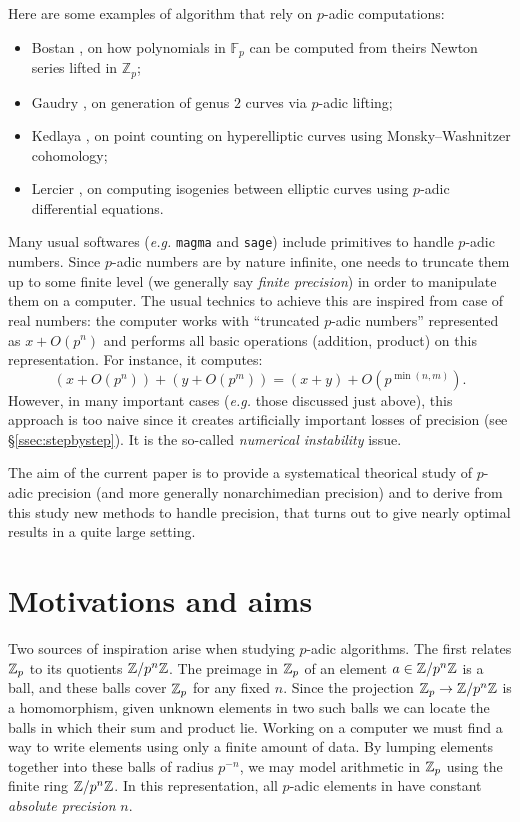 \documentclass{lms}
\begin{document}
Here are some examples of algorithm that rely on $p$-adic computations:
\begin{itemize}
\item Bostan \cite{Bostan}, on how polynomials in $\mathbb{F}_p$ can be computed from theirs Newton series lifted in $\mathbb{Z}_p$;
\item Gaudry \cite{Gaudry}, on generation of genus $2$ curves via $p$-adic lifting;
\item Kedlaya \cite{Kedlaya}, on point counting on hyperelliptic curves using Monsky--Washnitzer cohomology;
\item Lercier \cite{Lercier}, on computing isogenies between elliptic curves using $p$-adic differential equations.
\end{itemize}

Many usual softwares (\emph{e.g.} {\tt magma} and {\tt sage}) include 
primitives to handle $p$-adic numbers. Since $p$-adic numbers are by 
nature infinite, one needs to truncate them up to some finite level (we 
generally say \emph{finite precision}) in order to manipulate them on a 
computer. The usual technics to achieve this are inspired from case of 
real numbers: the computer works with ``truncated $p$-adic numbers'' 
represented as $x + O(p^n)$ and performs all basic operations (addition, 
product) on this representation. For instance, it computes: 
$$(x + O(p^n)) + (y + O(p^m)) = (x+y) + O(p^{\min(n,m)}).$$
However, in many important cases (\emph{e.g.} those discussed just 
above), this approach is too naive since it creates artificially 
important losses of precision (see \S\ref{ssec:stepbystep}). 
It is the so-called \emph{numerical instability} issue.

The aim of the current paper is to provide a systematical theorical 
study of $p$-adic precision (and more generally nonarchimedian 
precision) and to derive from this study new methods to handle 
precision, that turns out to give nearly optimal results in a quite 
large setting.

\section{Motivations and aims}

Two sources of inspiration arise when studying $p$-adic algorithms.
The first relates $\mathbb Z_p$ to its quotients $\mathbb Z/p^n\mathbb Z$.  The preimage in
$\mathbb Z_p$ of an element $a \in \mathbb Z / p^n \mathbb Z$ is a ball, and these balls cover
$\mathbb Z_p$ for any fixed $n$.  Since the projection $\mathbb Z_p \to \mathbb Z/p^n\mathbb Z$ is a
homomorphism, given unknown elements in two such balls we can
locate the balls in which their sum and product lie.  Working on a computer
we must find a way to write elements using only a finite amount of data.
By lumping elements together into these balls of radius $p^{-n}$, we may
model arithmetic in $\mathbb Z_p$ using the finite ring $\mathbb Z / p^n \mathbb Z$.  In this representation,
all $p$-adic elements in have constant \emph{absolute precision} $n$.
\end{document}
